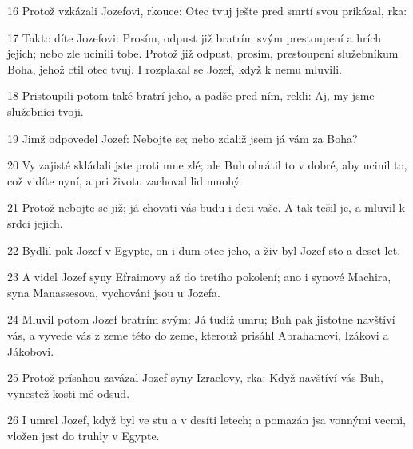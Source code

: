 \par 16 Protož vzkázali Jozefovi, rkouce: Otec tvuj ješte pred smrtí svou prikázal, rka:
\par 17 Takto díte Jozefovi: Prosím, odpust již bratrím svým prestoupení a hrích jejich; nebo zle ucinili tobe. Protož již odpust, prosím, prestoupení služebníkum Boha, jehož ctil otec tvuj. I rozplakal se Jozef, když k nemu mluvili.
\par 18 Pristoupili potom také bratrí jeho, a padše pred ním, rekli: Aj, my jsme služebníci tvoji.
\par 19 Jimž odpovedel Jozef: Nebojte se; nebo zdaliž jsem já vám za Boha?
\par 20 Vy zajisté skládali jste proti mne zlé; ale Buh obrátil to v dobré, aby ucinil to, což vidíte nyní, a pri životu zachoval lid mnohý.
\par 21 Protož nebojte se již; já chovati vás budu i deti vaše. A tak tešil je, a mluvil k srdci jejich.
\par 22 Bydlil pak Jozef v Egypte, on i dum otce jeho, a živ byl Jozef sto a deset let.
\par 23 A videl Jozef syny Efraimovy až do tretího pokolení; ano i synové Machira, syna Manassesova, vychováni jsou u Jozefa.
\par 24 Mluvil potom Jozef bratrím svým: Já tudíž umru; Buh pak jistotne navštíví vás, a vyvede vás z zeme této do zeme, kterouž prisáhl Abrahamovi, Izákovi a Jákobovi.
\par 25 Protož prísahou zavázal Jozef syny Izraelovy, rka: Když navštíví vás Buh, vynestež kosti mé odsud.
\par 26 I umrel Jozef, když byl ve stu a v desíti letech; a pomazán jsa vonnými vecmi, vložen jest do truhly v Egypte.

